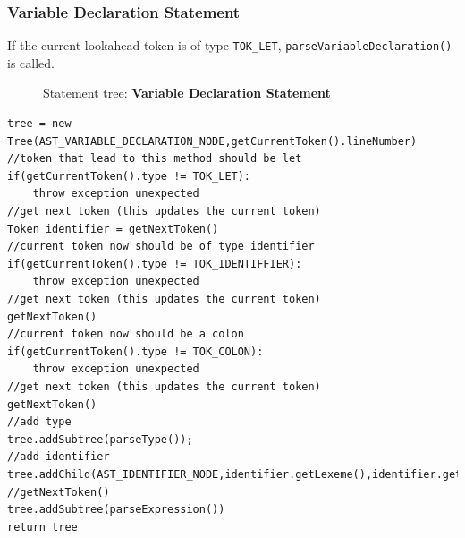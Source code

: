 \subsubsection{Variable Declaration Statement}
\label{sec:var tree statement}
If the current lookahead token is of type \verb!TOK_LET!, \verb!parseVariableDeclaration()! is called. 
\begin{figure}[H]
    \centering
    \caption{Statement tree: \textbf{Variable Declaration Statement}}
    \label{fig:variable declaration}
\end{figure}
\begin{lstlisting}[caption={PSEUDOCODE for building a variable declaration tree (\emph{parseVariableDeclaration())}},label=listing:variable declaration tree]
tree = new Tree(AST_VARIABLE_DECLARATION_NODE,getCurrentToken().lineNumber)
//token that lead to this method should be let
if(getCurrentToken().type != TOK_LET):
    throw exception unexpected
//get next token (this updates the current token)
Token identifier = getNextToken()
//current token now should be of type identifier
if(getCurrentToken().type != TOK_IDENTIFFIER):
    throw exception unexpected
//get next token (this updates the current token)
getNextToken()
//current token now should be a colon
if(getCurrentToken().type != TOK_COLON):
    throw exception unexpected
//get next token (this updates the current token)
getNextToken()
//add type 
tree.addSubtree(parseType());
//add identifier 
tree.addChild(AST_IDENTIFIER_NODE,identifier.getLexeme(),identifier.getLineNumber())
//getNextToken()
tree.addSubtree(parseExpression())
return tree
\end{lstlisting}

